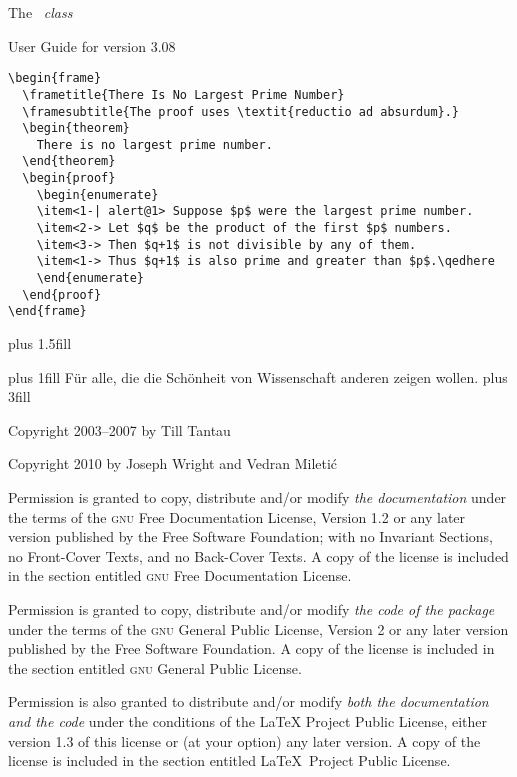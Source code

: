 \documentclass{ltxdoc}
\def\beamerugversion{3.08}
\begin{document}
{
  \parindent0pt
\vbox{}
\vskip 3.5cm
\Huge
The \beamer\ \textit{class}

\Large
User Guide for version \beamerugversion
\vskip 3cm



\normalsize
\begin{verbatim}
\begin{frame}
  \frametitle{There Is No Largest Prime Number}
  \framesubtitle{The proof uses \textit{reductio ad absurdum}.}
  \begin{theorem}
    There is no largest prime number.
  \end{theorem}
  \begin{proof}
    \begin{enumerate}
    \item<1-| alert@1> Suppose $p$ were the largest prime number.
    \item<2-> Let $q$ be the product of the first $p$ numbers.
    \item<3-> Then $q+1$ is not divisible by any of them.
    \item<1-> Thus $q+1$ is also prime and greater than $p$.\qedhere
    \end{enumerate}
  \end{proof}
\end{frame}
\end{verbatim}
\qquad{}
\vskip 0cm plus 1.5fill
\vbox{}
\clearpage
}

{
  \vbox{}
  \vskip0pt plus 1fill
  F\"ur alle, die die Sch\"onheit von Wissenschaft anderen zeigen wollen.
  \vskip0pt plus 3fill

  \parindent=0pt
  Copyright 2003--2007 by Till Tantau

  Copyright 2010 by Joseph Wright and Vedran Mileti\'c

  \medskip
  Permission is granted to copy, distribute and/or modify \emph{the documentation} under the terms of the \textsc{gnu} Free Documentation License, Version 1.2 or any later version published by the Free Software Foundation; with no Invariant Sections, no Front-Cover Texts, and no Back-Cover Texts. A copy of the license is included in the section entitled \textsc{gnu} Free Documentation License.

  \medskip
  Permission is granted to copy, distribute and/or modify \emph{the code of the package} under the terms of the \textsc{gnu} General Public License, Version 2 or any later version published by the Free Software Foundation. A copy of the license is included in the section entitled \textsc{gnu} General Public License.

  \medskip
  Permission is also granted to distribute and/or modify \emph{both the documentation and the code} under the conditions of the LaTeX Project Public License, either version 1.3 of this license or (at your option) any later version. A copy of the license is included in the section entitled \LaTeX\ Project Public License.

  \vbox{}
  \clearpage
}
\end{document}
